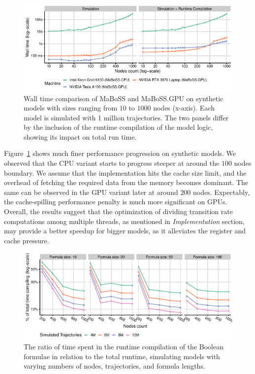 \documentclass[sn-mathphys-num]{sn-jnl}%
\begin{document}
\begin{figure}
    \centering
    \includegraphics[width=\linewidth]{plots/nodes.pdf}
    \caption{Wall time comparison of MaBoSS and MaBoSS.GPU on synthetic models with sizes ranging from $10$ to $1000$ nodes (x-axis). Each model is simulated with 1 million trajectories. The two panels differ by the inclusion of the runtime compilation of the model logic, showing its impact on total run time.}
    \label{fig:synth}
\end{figure}

Figure~\ref{fig:synth} shows much finer performance progression on synthetic models. We observed that the CPU variant starts to progress steeper at around the $100$ nodes boundary. We assume that the implementation hits the cache size limit, and the overhead of fetching the required data from the memory becomes dominant. The same can be observed in the GPU variant later at around $200$ nodes. Expectably, the cache-spilling performance penalty is much more significant on GPUs. Overall, the results suggest that the optimization of dividing transition rate computations among multiple threads, as mentioned in \emph{Implementation} section, may provide a better speedup for bigger models, as it alleviates the register and cache pressure.

\begin{figure}
    \centering
    \includegraphics[width=\linewidth]{plots/nodes-compilation-big-NVIDIA Tesla A100 (MaBoSS.GPU).pdf}
    \caption{The ratio of time spent in the runtime compilation of the Boolean formulae in relation to the total runtime, simulating models with varying numbers of nodes, trajectories, and formula lengths.}
    \label{fig:comp}
\end{figure}
\end{document}
